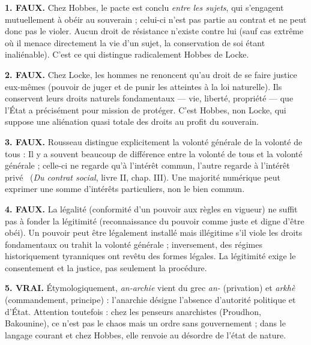 \documentclass[11pt]{article}
\begin{document}
\begin{corrige}

\textbf{1. FAUX.} Chez Hobbes, le pacte est conclu \emph{entre les sujets}, qui s'engagent mutuellement à obéir au souverain ; celui-ci n'est pas partie au contrat et ne peut donc pas le violer. Aucun droit de résistance n'existe contre lui (sauf cas extrême où il menace directement la vie d'un sujet, la conservation de soi étant inaliénable). C'est ce qui distingue radicalement Hobbes de Locke.

\textbf{2. FAUX.} Chez Locke, les hommes ne renoncent qu'au droit de se faire justice eux-mêmes (pouvoir de juger et de punir les atteintes à la loi naturelle). Ils conservent leurs droits naturels fondamentaux — vie, liberté, propriété — que l'État a précisément pour mission de protéger. C'est Hobbes, non Locke, qui suppose une aliénation quasi totale des droits au profit du souverain.

\textbf{3. FAUX.} Rousseau distingue explicitement la volonté générale de la volonté de tous : \guillemotleft Il y a souvent beaucoup de différence entre la volonté de tous et la volonté générale ; celle-ci ne regarde qu'à l'intérêt commun, l'autre regarde à l'intérêt privé \guillemotright\ (\emph{Du contrat social}, livre II, chap. III). Une majorité numérique peut exprimer une somme d'intérêts particuliers, non le bien commun.

\textbf{4. FAUX.} La légalité (conformité d'un pouvoir aux règles en vigueur) ne suffit pas à fonder la légitimité (reconnaissance du pouvoir comme juste et digne d'être obéi). Un pouvoir peut être légalement installé mais illégitime s'il viole les droits fondamentaux ou trahit la volonté générale ; inversement, des régimes historiquement tyranniques ont revêtu des formes légales. La légitimité exige le consentement et la justice, pas seulement la procédure.

\textbf{5. VRAI.} Étymologiquement, \emph{an-archie} vient du grec \emph{an-} (privation) et \emph{arkhè} (commandement, principe) : l'anarchie désigne l'absence d'autorité politique et d'État. Attention toutefois : chez les penseurs anarchistes (Proudhon, Bakounine), ce n'est pas le chaos mais un ordre sans gouvernement ; dans le langage courant et chez Hobbes, elle renvoie au désordre de l'état de nature.

\end{corrige}
\end{document}
